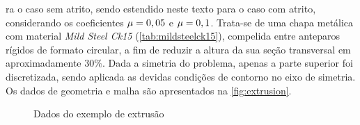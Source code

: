 \documentclass[Tese.tex]{subfiles}
\begin{document}
ra o caso sem atrito, sendo estendido neste texto para o caso com atrito, considerando os coeficientes $\mu=0,05$ e $\mu=0,1$. Trata-se de uma chapa metálica com material \emph{Mild Steel Ck15} (\autoref{tab:mildsteelck15}), compelida entre anteparos rígidos de formato circular, a fim de reduzir a altura da sua seção transversal em aproximadamente $30\%$. Dada a simetria do problema, apenas a parte superior foi discretizada, sendo aplicada as devidas condições de contorno no eixo de simetria. Os dados de geometria e malha são apresentados na \autoref{fig:extrusion}.

\begin{figure}[!htb]
	\centering
	\caption{Dados do exemplo de extrusão}
	\label{fig:extrusion}
	{\small
		\noindent{}
	}	
\end{figure}
\end{document}
